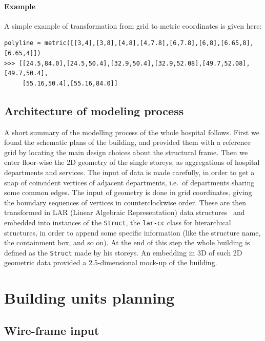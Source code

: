 \documentclass[11pt,oneside]{article}    %
\begin{document}
\paragraph{Example} 
A simple example of transformation from grid to metric coordinates is given here:
{\small 
\begin{verbatim}
polyline = metric([[3,4],[3,8],[4,8],[4,7.8],[6,7.8],[6,8],[6.65,8],[6.65,4]])
>>> [[24.5,84.0],[24.5,50.4],[32.9,50.4],[32.9,52.08],[49.7,52.08],[49.7,50.4],
     [55.16,50.4],[55.16,84.0]]
\end{verbatim}}



\subsection{Architecture of modeling process}

A short summary of the  modelling process of the whole hospital follows. First we found the schematic plans of the building,
and provided them with a reference grid by locating the main design choices about the structural frame.
Then we enter floor-wise the 2D geometry of the single storeys, as aggregations of hospital departments and services.
The input of data is made carefully, in order to get a snap of coincident vertices of adjacent departments, i.e.~of departments sharing some common edges. The input of geometry is done in grid coordinates, giving the boundary sequences of vertices in counterclockwise order. These are then transformed in LAR (Linear Algebraic Representation) data structures~\cite{Dicarlo:2014:TNL:2543138.2543294} and embedded into instances of the \texttt{Struct}, the \texttt{lar-cc} class for  hierarchical structures, in order to append some specific information (like the structure name, the containment box, and so on). At the end of this step the whole building is defined as the \texttt{Struct} made by his storeys. An embedding in 3D of such 2D geometric data provided a 2.5-dimensional mock-up of the building.


\section{Building units planning}

\subsection{Wire-frame input}
\end{document}
